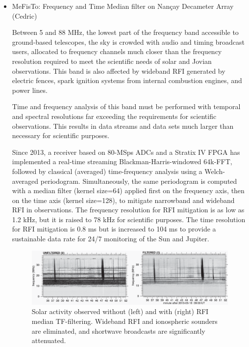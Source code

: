 \begin{itemize}
\item MeFisTo: Frequency and Time Median filter on Nançay Decameter Array (Cedric)

Between 5 and 88 MHz, the lowest part of the frequency band accessible to ground-based telescopes, the sky is crowded with audio and timing broadcast users, allocated to frequency channels much closer than the frequency resolution required to meet the scientific needs of solar and Jovian observations. This band is also affected by wideband RFI generated by electric fences, spark ignition systems from internal combustion engines, and power lines.

Time and frequency analysis of this band must be performed with temporal and spectral resolutions far exceeding the requirements for scientific observations. This results in data streams and data sets much larger than necessary for scientific purposes.

Since 2013, a receiver \cite{lecacheux2013, 2017pre8.conf..455L} based on 80-MSps ADCs and a Stratix IV FPGA has implemented a real-time streaming Blackman-Harris-windowed 64k-FFT, followed by classical (averaged) time-frequency analysis using a Welch-averaged periodogram. Simultaneously, the same periodogram is computed with a median filter (kernel size=64) applied first on the frequency axis, then on the time axis (kernel size=128), to mitigate narrowband and wideband RFI in observations. The frequency resolution for RFI mitigation is as low as 1.2 kHz, but it is raised to 78 kHz for scientific purposes. The time resolution for RFI mitigation is 0.8 ms but is increased to 104 ms to provide a sustainable data rate for 24/7 monitoring of the Sun and Jupiter.

\begin{figure}
    \centering
    \includegraphics[width=\textwidth]{figures/MeFisTo.png}
    \caption{Solar activity observed without (left) and with (right) RFI median TF-filtering.  Wideband RFI and ionospheric sounders are eliminated, and shortwave broadcasts are significantly attenuated.}
    \label{fig:rfi_MeFisTo}
\end{figure}



\end{itemize}
